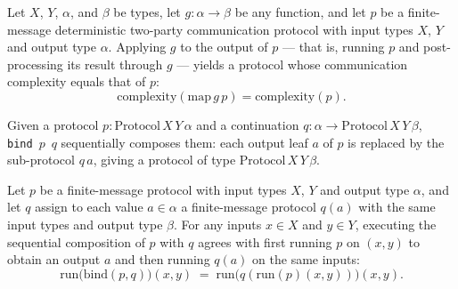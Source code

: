 \begin{theorem}
\label{CommunicationComplexity.Deterministic.FiniteMessage.Protocol.map_complexity}
\leanok
{}
Let $X$, $Y$, $\alpha$, and $\beta$ be types, let $g : \alpha \to \beta$ be any
function, and let $p$ be a finite-message deterministic two-party communication protocol
with input types $X$, $Y$ and output type $\alpha$. Applying $g$ to the output of $p$ —
that is, running $p$ and post-processing its result through $g$ — yields a protocol
whose communication complexity equals that of $p$: \[
\mathrm{complexity}(\mathrm{map}\,g\,p) = \mathrm{complexity}(p). \]
\end{theorem}

\begin{definition}
\label{CommunicationComplexity.Deterministic.FiniteMessage.Protocol.bind}
\leanok
{}
Given a protocol $p : \mathrm{Protocol}\,X\,Y\,\alpha$ and a continuation
$q : \alpha \to \mathrm{Protocol}\,X\,Y\,\beta$, \texttt{bind}~$p$~$q$ sequentially
composes them: each output leaf $a$ of $p$ is replaced by the sub-protocol $q\,a$,
giving a protocol of type $\mathrm{Protocol}\,X\,Y\,\beta$.
\end{definition}

\begin{theorem}
\label{CommunicationComplexity.Deterministic.FiniteMessage.Protocol.bind_run}
\leanok
{}
Let $p$ be a finite-message protocol with input types $X$, $Y$ and output type $\alpha$,
and let $q$ assign to each value $a \in \alpha$ a finite-message protocol $q(a)$ with
the same input types and output type $\beta$. For any inputs $x \in X$ and $y \in Y$,
executing the sequential composition of $p$ with $q$ agrees with first running $p$ on
$(x,y)$ to obtain an output $a$ and then running $q(a)$ on the same inputs:
\[
\mathrm{run}\bigl(\mathrm{bind}(p,q)\bigr)(x,y) \;=\;
\mathrm{run}\bigl(q(\mathrm{run}(p)(x,y))\bigr)(x,y).
\]
\end{theorem}

